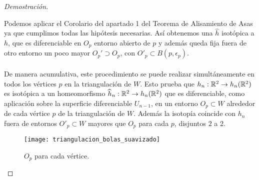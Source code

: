 \begin{proof}[Demostración]
\begin{enumerate}
			Podemos aplicar el Corolario del apartado 1 del Teorema de Alisamiento de Asas ya que cumplimos todas las hipótesis necesarias. Así obtenemos una $\widehat{h}$ isotópica a $h$, que es diferenciable en $O_p$ entorno abierto de $p$ y además queda fija fuera de otro entorno un poco mayor $O_p'\supset O_p$, con $O'_p\subset B(p, \epsilon_p) $.\\
			\\ De manera acumulativa, este procedimiento se puede realizar simultáneamente en todos los vértices $p$ en la triangulación de $W$. Esto prueba que $h_n: \mathbb{R}^2 \rightarrow h_n(\mathbb{R}^2)$ es isotópica a un homeomorfismo $\widehat{h}_n: \mathbb{R}^2 \rightarrow h_n(\mathbb{R}^2)$ que es diferenciable, como aplicación sobre la superficie diferenciable $U_{n-1}$, en un entorno $O_p \subset W$ alrededor de cada vértice $p$ de la triangulación de $W$. Además la isotopía coincide con $h_n$ fuera de entornos $O'_p \subset W$ mayores que $O_p$ para cada $p$, disjuntos $2$ a $2$.\\
			\begin{figure}[h]
  				\centering
  				\texttt{[image: triangulacion\_bolas\_suavizado]}
  				\caption{$O_p$ para cada vértice.}
  				\label{fig:triangulacion_bolas_suavizado}
			\end{figure}


\end{enumerate}
\end{proof}
